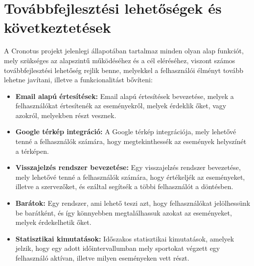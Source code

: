 \chapter*{Továbbfejlesztési lehetőségek és következtetések} \label{fejezet4}
\onehalfspacing
A Cronotus projekt jelenlegi állapotában tartalmaz minden olyan alap funkciót, mely szükséges az alapszintű működéséhez
és a cél eléréséhez, viszont számos továbbfejlesztési lehetőség rejlik benne, melyekkel a felhasználói élményt tovább
lehetne javítani, illetve a funkcionalitást bővíteni:

\begin{itemize}
	\item \textbf{Email alapú értesítések:} Email alapú értesítések bevezetése, melyek a felhasználókat értesítenék az eseményekről, melyek érdeklik őket, vagy azokról, melyekben részt vesznek.
	
	\item \textbf{Google térkép integráció:} A Google térkép integrációja, mely lehetővé tenné a felhasználók számára, hogy megtekinthessék az események helyszínét a térképen.
	
	\item \textbf{Visszajelzés rendszer bevezetése:} Egy visszajelzés rendszer bevezetése, mely lehetővé tenné a felhasználók számára, hogy értékeljék az eseményeket, illetve a szervezőket, és ezáltal segítsék a többi felhasználót a döntésben.
	
	\item \textbf{Barátok:} Egy rendszer, ami lehető teszi azt, hogy felhasználókat jelölhessünk be barátként, és így könnyebben megtalálhassuk azokat az eseményeket, melyek érdekelhetik őket.
	
	\item \textbf{Statisztikai kimutatások:} Időszakos statisztikai kimutatások, amelyek jelzik, hogy egy adott időintervallumban mely sportokat végzett egy felhasználó aktívan, illetve milyen eseményeken vett részt.
\end{itemize}

